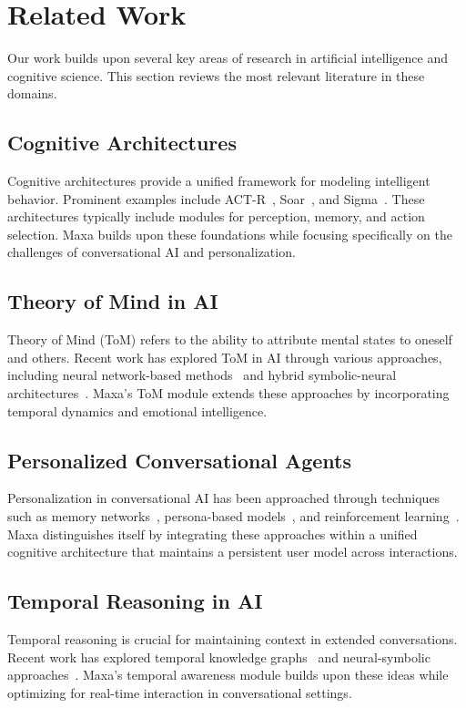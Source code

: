 \section{Related Work}
\label{sec:related}

Our work builds upon several key areas of research in artificial intelligence and cognitive science. This section reviews the most relevant literature in these domains.

\subsection{Cognitive Architectures}
Cognitive architectures provide a unified framework for modeling intelligent behavior. Prominent examples include ACT-R~\cite{anderson2004integrated}, Soar~\cite{laird2012soar}, and Sigma~\cite{rosenbloom2016sigma}. These architectures typically include modules for perception, memory, and action selection. Maxa builds upon these foundations while focusing specifically on the challenges of conversational AI and personalization.

\subsection{Theory of Mind in AI}
Theory of Mind (ToM) refers to the ability to attribute mental states to oneself and others. Recent work has explored ToM in AI through various approaches, including neural network-based methods~\cite{rabinowitz2018machine} and hybrid symbolic-neural architectures~\cite{shridhar2020alfred}. Maxa's ToM module extends these approaches by incorporating temporal dynamics and emotional intelligence.

\subsection{Personalized Conversational Agents}
Personalization in conversational AI has been approached through techniques such as memory networks~\cite{sukhbaatar2015end}, persona-based models~\cite{zhang2018personalizing}, and reinforcement learning~\cite{li2016deep}. Maxa distinguishes itself by integrating these approaches within a unified cognitive architecture that maintains a persistent user model across interactions.

\subsection{Temporal Reasoning in AI}
Temporal reasoning is crucial for maintaining context in extended conversations. Recent work has explored temporal knowledge graphs~\cite{jia2021temporal} and neural-symbolic approaches~\cite{sinha2020clutrr}. Maxa's temporal awareness module builds upon these ideas while optimizing for real-time interaction in conversational settings.
